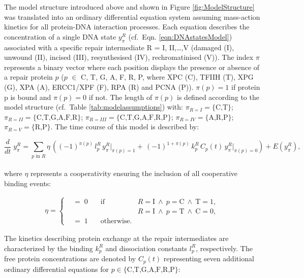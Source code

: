The model structure introduced above and shown in Figure \ref{fig:ModelStructure} was translated into an ordinary differential equation system assuming mass-action kinetics for all protein-DNA interaction processes. Each equation describes the concentration of a single DNA state $y_{\pi}^{R}$ (cf.\ Eqn. \ref{eqn:DNAstatesModel}) associated with a specific repair intermediate R = I, II,\dots,V (damaged (I), unwound (II), incised (III), resynthesised (IV), rechromatinised (V)). The index $\pi$ represents a binary vector where each position displays the presence or absence of a repair protein $p$ ($p$ $\in$ {C, T, G, A, F, R, P}, where XPC (C), TFIIH (T), XPG (G), XPA (A), ERCC1/XPF (F), RPA (R) and PCNA (P)). $\pi(p)=1$ if protein p is bound and $\pi(p)=0$ if not. The length of $\pi(p)$ is defined according to the model structure (cf.\ Table \ref{tab:modelassumptions}) with: $\pi_{R=I} = \{ \text{C,T} \}$; $\pi_{R=II} = \{ \text{C,T,G,A,F,R} \}$; $\pi_{R=III} = \{ \text{C,T,G,A,F,R,P} \}$; $\pi_{R=IV} = \{ \text{A,R,P} \}$; $\pi_{R=V} = \{ \text{R,P} \}$. The time course of this model is described by:

\begin{equation}\label{eqn:DNAstatesModel}
\frac{d}{dt}\;y_{\pi}^{R} =\sum_{p\text{ in }R}\eta \, \left( (-1)^{\pi(p)} \,l_{p}^{ R}\, y_{\pi}^{R}\left. \right|_{\pi(p)=1}+  \, (-1)^{1+\pi(p)}\, k_{p}^{ R} \,C_p(t)\,y_{\pi}^{R}\left. \right|_{\pi(p)=0}\right ) +E(y_{\pi}^{R}),
\end{equation}\\
where $\eta$ represents a cooperativity ensuring the inclusion of all cooperative binding events:

\begin{align*}
\eta =\left\{
\begin{array}{llll}
& =\; 0 \quad   &\text{if}& R=\text{I} ~\wedge~ p=\text{C} ~\wedge~ \text{T}=1, \\
&     && R=\text{I} ~\wedge~ p=\text{T} ~\wedge~ \text{C}=0,\\
& = \; 1 \quad &\text{otherwise}.&
\end{array}
\right.
\end{align*}
  
The kinetics describing protein exchange at the repair intermediates are characterized by the binding $k_{p}^{ R}$ and dissociation constants $l_{p}^{ R}$, respectively. The free protein concentrations are denoted by $C_p(t)$ representing seven additional ordinary differential equations for $p \in \{\text{C,T,G,A,F,R,P}\}$:

